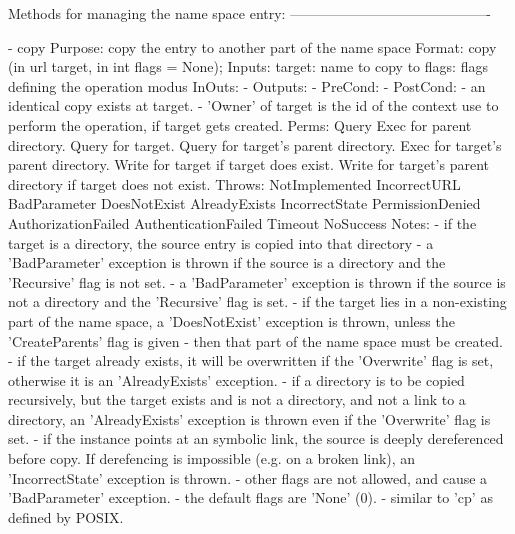 \begin{myspec}
    Methods for managing the name space entry:
    -------------------------------------------
 
    - copy
      Purpose:  copy the entry to another part of the name space
      Format:   copy               (in  url       target,
                                    in  int       flags = None);
      Inputs:   target:             name to copy to
                flags:              flags defining the operation
                                    modus
      InOuts:   -
      Outputs:  -
      PreCond:  -
      PostCond: - an identical copy exists at target.
                - 'Owner' of target is the id of the context
                  use to perform the operation, if target gets
                  created.
      Perms:    Query 
                Exec  for parent directory.
                Query for target.
                Query for target's parent directory.
                Exec  for target's parent directory.
                Write for target
                      if  target does exist.
                Write for target's parent directory 
                      if  target does not exist.
      Throws:   NotImplemented
                IncorrectURL
                BadParameter
                DoesNotExist
                AlreadyExists
                IncorrectState
                PermissionDenied
                AuthorizationFailed
                AuthenticationFailed
                Timeout
                NoSuccess
      Notes:    - if the target is a directory, the source entry
                  is copied into that directory
                - a 'BadParameter' exception is thrown if the 
                  source is a directory and the 'Recursive' flag 
                  is not set.
                - a 'BadParameter' exception is thrown if the 
                  source is not a directory and the 'Recursive' 
                  flag is set.
                - if the target lies in a non-existing part of
                  the name space, a 'DoesNotExist' exception is
                  thrown, unless the 'CreateParents' flag is
                  given - then that part of the name space must
                  be created.
                - if the target already exists, it will be
                  overwritten if the 'Overwrite' flag is set,
                  otherwise it is an 'AlreadyExists' exception.
                - if a directory is to be copied recursively,
                  but the target exists and is not a directory,
                  and not a link to a directory, an
                  'AlreadyExists' exception is thrown even if
                  the 'Overwrite' flag is set. 
                - if the instance points at an symbolic link, 
                  the source is deeply dereferenced before copy.
                  If derefencing is impossible (e.g. on a broken 
                  link), an 'IncorrectState' exception is thrown.
                - other flags are not allowed, and cause a
                  'BadParameter' exception.
                - the default flags are 'None' (0).
                - similar to 'cp' as defined by POSIX.
 

\end{myspec}
